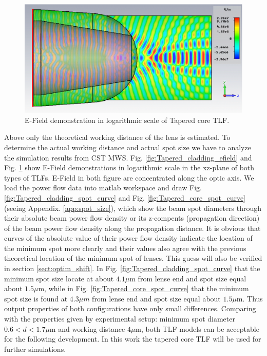 \begin{figure}[!ht]
	\centering
		\includegraphics[width=0.7 \textwidth]{bilder/cst_lensed_fiber_efield}
		\caption{E-Field demonstration in logarithmic scale of Tapered core TLF.}
 		\label{fig:Tapered_core_efield}	
\end{figure}
Above only the theoretical working distance of the lens is  estimated. To determine the actual working distance and actual spot size we have to analyze the simulation results from CST MWS. Fig. \ref{fig:Tapered_cladding_efield} and Fig. \ref{fig:Tapered_core_efield} show  E-Field demonstrations  in logarithmic scale in the xz-plane of both types of TLFs. E-Field in both figure are concentrated along the optic axis. We load the power flow data into matlab workspace and draw Fig. \ref{fig:Tapered_cladding_spot_curve} and Fig. \ref{fig:Tapered_core_spot_curve} (seeing Appendix. \ref{app:spot_size}), which show the beam spot diameters through their absolute beam power flow density or its z-compents (propagation direction) of the beam power flow density along the propagation distance. It is obvious that curves of the absolute value of their power flow density indicate the location of the minimum spot more clearly and their values also agree with the previous theoretical location of the minimum spot of lenses. This guess will also be verified in section \ref{sect:optim_shift}. In Fig. \ref{fig:Tapered_cladding_spot_curve} that the minimum spot size locate at about $4.1 \mu$m from lense end and spot size equal about $1.5 \mu$m, while in Fig. \ref{fig:Tapered_core_spot_curve} that the minimum spot size is found at  $4.3 \mu m$ from lense end and spot size equal about $1.5 \mu$m. Thus output properties of both configurations have only small differences. Comparing with the properties given by experimental setup: minimum spot diameter $0.6<d<1.7 \mu$m and working distance $4\mu$m, both TLF models can be acceptable for the following development. In this work the tapered core TLF will be used for further simulations.\\
